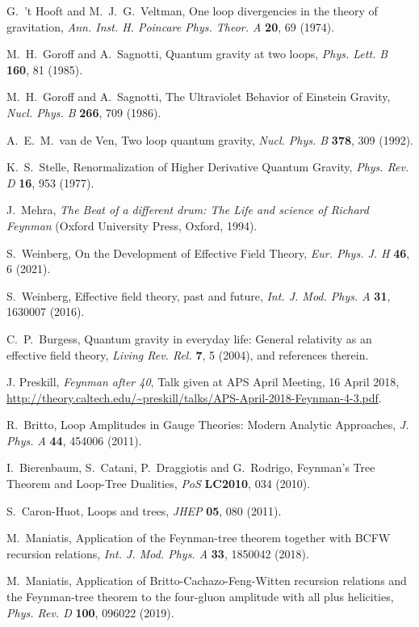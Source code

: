 \documentclass{ws-procs961x669}            %
\begin{document}
\begin{thebibliography}{10}
G.~'t Hooft and M.~J.~G.~Veltman, One loop divergencies in the theory of gravitation, {\em Ann. Inst. H. Poincare Phys. Theor. A } {\bf 20}, 69 (1974).

M.~H.~Goroff and A.~Sagnotti, Quantum gravity at two loops, {\em Phys. Lett. B } {\bf 160}, 81 (1985).

M.~H.~Goroff and A.~Sagnotti, The Ultraviolet Behavior of Einstein Gravity, {\em Nucl. Phys. B } {\bf 266}, 709 (1986).

A.~E.~M.~van de Ven, Two loop quantum gravity, {\em Nucl. Phys. B } {\bf 378}, 309 (1992).

K.~S.~Stelle, Renormalization of Higher Derivative Quantum Gravity, {\em Phys. Rev. D } {\bf 16}, 953 (1977).

J.~Mehra, {\em The Beat of a different drum: The Life and science of Richard Feynman} (Oxford University Press, Oxford, 1994).

S.~Weinberg, On the Development of Effective Field Theory, {\em Eur. Phys. J. H } {\bf 46}, 6 (2021).

S.~Weinberg, Effective field theory, past and future, {\em Int. J. Mod. Phys. A } {\bf 31}, 1630007 (2016).

C.~P.~Burgess, Quantum gravity in everyday life: General relativity as an effective field theory, {\em Living Rev. Rel. } {\bf 7}, 5 (2004), and references therein.

J. Preskill, {\em Feynman after 40}, Talk given at APS April Meeting, 16 April 2018,
\url{http://theory.caltech.edu/~preskill/talks/APS-April-2018-Feynman-4-3.pdf}.

R.~Britto, Loop Amplitudes in Gauge Theories: Modern Analytic Approaches, {\em J. Phys. A} {\bf 44}, 454006 (2011).

I.~Bierenbaum, S.~Catani, P.~Draggiotis and G.~Rodrigo, Feynman's Tree Theorem and Loop-Tree Dualities, {\em PoS} {\bf LC2010}, 034 (2010).

S.~Caron-Huot, Loops and trees, {\em JHEP} {\bf 05}, 080 (2011).

M.~Maniatis, Application of the Feynman-tree theorem together with BCFW recursion relations, {\em Int. J. Mod. Phys. A} {\bf 33}, 1850042 (2018).

M.~Maniatis, Application of Britto-Cachazo-Feng-Witten recursion relations and the Feynman-tree theorem to the four-gluon amplitude with all plus helicities, {\em Phys. Rev. D} {\bf 100}, 096022 (2019).


\end{thebibliography}
\end{document}

